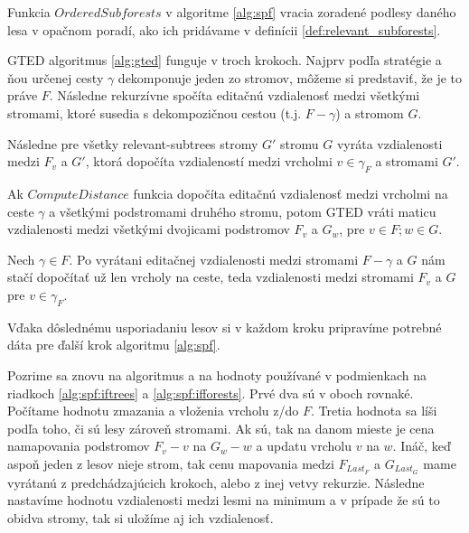 

\begin{pozn}
  Funkcia $OrderedSubforests$ v algoritme \ref{alg:spf} vracia zoradené podlesy daného lesa
  v opačnom poradí, ako ich pridávame v definícii \ref{def:relevant_subforests}.
\end{pozn}

GTED algoritmus \ref{alg:gted} funguje v troch krokoch.
Najprv podľa stratégie a ňou určenej cesty $\gamma$ dekomponuje jeden zo stromov,
môžeme si predstaviť, že je to práve $F$. Následne rekurzívne spočíta editačnú vzdialenosť
medzi všetkými stromami, ktoré susedia s dekompozičnou cestou (t.j. $F - \gamma$) a stromom $G$.

Následne pre všetky relevant-subtrees stromy $G'$ stromu $G$ vyráta vzdialenosti medzi $F_{v}$
a $G'$, ktorá dopočíta vzdialeností medzi vrcholmi $v \in \gamma_{F}$ a stromami $G'$.

\begin{lemma}
  Ak $ComputeDistance$ funkcia dopočíta editačnú vzdialenosť medzi vrcholmi na ceste $\gamma$
  a všetkými podstromami druhého stromu, potom GTED vráti maticu vzdialenosti
  medzi všetkými dvojicami podstromov $F_{v}$ a $G_{w}$, pre $v \in F; w \in G$.
\end{lemma}

\begin{dukaz}
  Nech $\gamma \in F$. Po vyrátani editačnej vzdialenosti medzi stromami
  $F - \gamma$ a $G$ nám stačí dopočítať už len vrcholy na ceste,
  teda vzdialenosti medzi stromami $F_{v}$ a $G$ pre $v \in \gamma_{F}$.
\end{dukaz}

Vďaka dôslednému usporiadaniu lesov si v každom kroku pripravíme potrebné
dáta pre ďalší krok algoritmu \ref{alg:spf}.

Pozrime sa znovu na algoritmus a na hodnoty používané v podmienkach na riadkoch
\ref{alg:spf:iftrees} a \ref{alg:spf:ifforests}. Prvé dva sú v oboch rovnaké.
Počítame hodnotu zmazania a vloženia vrcholu z/do $F$.
Tretia hodnota sa líši podľa toho, či sú lesy zároveň stromami. Ak sú, tak na danom mieste
je cena namapovania podstromov $F_{v} - v$ na $G_{w} - w$ a updatu vrcholu $v$ na $w$.
Ináč, keď aspoň jeden z lesov nieje strom, tak cenu mapovania medzi $F_{Last_{F}}$ a $G_{Last_{G}}$
mame vyrátanú z predchádzajúcich krokoch, alebo z inej vetvy rekurzie.
Následne nastavíme hodnotu vzdialenosti medzi lesmi na minimum a v prípade že sú to obidva stromy,
tak si uložíme aj ich vzdialenosť.

